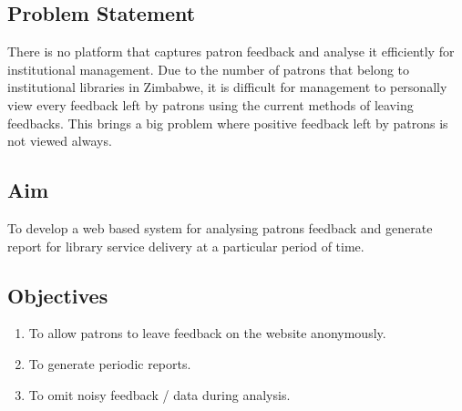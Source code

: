 \documentclass[12pt]{report}
\begin{document}
	
	\subsection{Problem Statement}
There is no platform that captures patron feedback and analyse it efficiently for institutional management. Due to the number of patrons that belong to institutional libraries in Zimbabwe, it is difficult for management to personally view every feedback left by patrons using the current methods of leaving feedbacks. This brings a big problem where positive feedback left by patrons is not viewed always. 
	\subsection{Aim}
	To develop a web based system for analysing patrons feedback and generate report for library service delivery at a particular period of time.
	\subsection{Objectives}
	\begin{enumerate}
		\item To allow patrons to leave feedback on the website anonymously.
		\item To generate periodic reports.
		\item  To omit noisy feedback / data during analysis.
	\end{enumerate}
	
	
\end{document}
